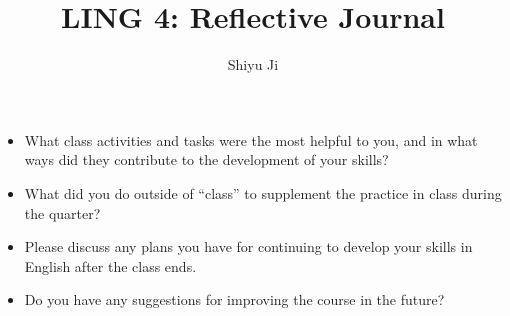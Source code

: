\documentclass{article}
\begin{document}
\title{LING 4: Reflective Journal}
\author{Shiyu Ji}
\date{}
\maketitle

\begin{itemize}

\item
What class activities and tasks were the most helpful to you, 
and in what ways did they contribute to the development of your skills?

\item
What did you do outside of “class” to supplement the practice in class during the quarter?

\item 
Please discuss any plans you have for continuing to develop your skills in English after the class ends.

\item 
Do you have any suggestions for improving the course in the future?

\end{itemize}
\end{document}

